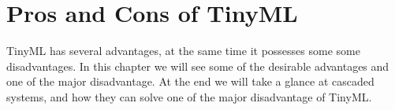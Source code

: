 \documentclass[../main]{subfiles}
\begin{document}
\chapter{Pros and Cons of TinyML} \label{chp:benefitsTinyML}

TinyML has several advantages, at the same time it possesses some
some disadvantages. In this chapter we will see some of the
desirable advantages and one of the major disadvantage. At the
end we will take a glance at cascaded systems, and how they can
solve one of the major disadvantage of TinyML.





% 

% 

% 
\end{document}
